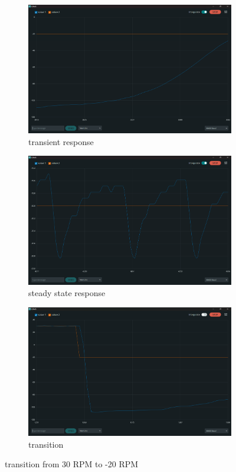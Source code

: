\documentclass[12pt]{article}
\begin{document}
\begin{figure}[h]
    \centering
	\begin{subfigure}{.48\textwidth}
        \centering
        \includegraphics[width=0.95\linewidth]{images/q3/Transient_-20.png}
		\caption{transient response}
    \end{subfigure}
    \begin{subfigure}{.48\textwidth}
        \centering
        \includegraphics[width=0.95\linewidth]{images/q3/SS_-20.png} 
		\caption{steady state response}
    \end{subfigure}
    \begin{subfigure}{.48\textwidth}
        \centering
        \includegraphics[width=0.95\linewidth]{images/q3/Transition_30_to_-20.png} 
        \caption{transition}
    \end{subfigure}
    \caption{transition from 30 RPM to -20 RPM}
\end{figure}
\end{document}
